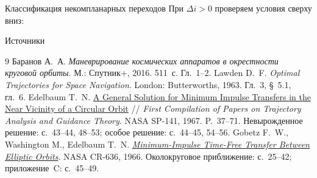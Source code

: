 \documentclass[11pt,aspectratio=169,t]{beamer}
\newcommand{\derivationmathspacing}{%
  \setlength{\abovedisplayskip}{2pt}%
  \setlength{\belowdisplayskip}{3pt}%
  \setlength{\abovedisplayshortskip}{2pt}%
  \setlength{\belowdisplayshortskip}{2pt}%
  \setlength{\jot}{2pt}}
\begin{document}
\begin{frame}{Классификация некомпланарных переходов}
\relax
\derivationmathspacing
При $\Delta i>0$ проверяем условия сверху вниз:
\par
\centering

\end{frame}

\begin{frame}{Источники}
\relax
{}
\begin{thebibliography}{9}
Баранов А.~А. \textit{Маневрирование космических аппаратов
в окрестности круговой орбиты}.
М.: Спутник+, 2016. 511~с. Гл.~1--2.
Lawden D.~F. \textit{Optimal Trajectories for Space Navigation}.
London: Butterworths, 1963. Гл.~3, \S~5.1, гл.~6.
Edelbaum T.~N.
\href{https://ntrs.nasa.gov/citations/19670020044}{A General Solution for Minimum Impulse Transfers
in the Near Vicinity of a Circular Orbit} //
\textit{First Compilation of Papers on Trajectory Analysis and Guidance Theory}.
NASA SP-141, 1967. P.~37--71.
Невырожденное решение: с.~43--44, 48--53;
особое решение: с.~44--45, 54--56.
Gobetz F.~W., Washington M., Edelbaum T.~N.
\href{https://ntrs.nasa.gov/citations/19660030604}{\textit{Minimum-Impulse Time-Free Transfer Between Elliptic Orbits}}.
NASA CR-636, 1966. Околокруговое приближение: с.~25--42;
приложение~C: с.~45--49.
\end{thebibliography}
\end{frame}
\end{document}
